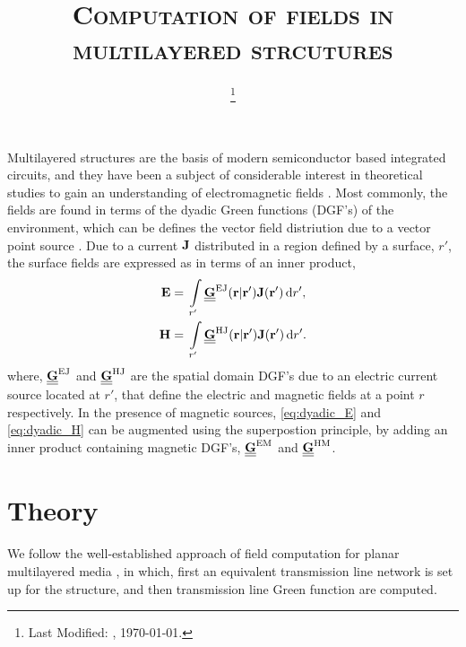 \documentclass[12pt]{article}
\begin{document}
\title{\textsc{Computation of fields in multilayered strcutures}}

\date{\footnote{Last Modified: \currenttime, \today.}}

\maketitle

Multilayered structures are the basis of modern semiconductor based integrated circuits, and they have been a subject of considerable interest in theoretical studies to gain an understanding of electromagnetic fields \cite{something in here}. Most commonly, the fields are found in terms of the dyadic Green functions (DGF's) of the environment, which can be defines the vector field distriution due to a vector point source \cite{van Bladdel} \cite{}. Due to a current $\mathbf{J}$ distributed in a region defined by a surface, $r'$, the surface fields are expressed as in terms of an inner product,
%
\begin{subequations}
  \begin{align}
    \mathbf{E} ={}& \int\limits_{r'} \underline{\underline{\mathbf{G}}}^\mathrm{EJ}(\mathbf{r} | \mathbf{r'}) \mathbf{J}(\mathbf{r'}) \mathop{}\!\mathrm{d}{r'},
    \label{eq:dyadic_E}\\
    \mathbf{H} ={}& \int\limits_{r'} \underline{\underline{\mathbf{G}}}^\mathrm{HJ}(\mathbf{r} | \mathbf{r'}) \mathbf{J}(\mathbf{r'}) \mathop{}\!\mathrm{d}{r'}.
    \label{eq:dyadic_H}
  \end{align}
  \label{eq:dyadic}%
\end{subequations}
where, $\underline{\underline{\mathbf{G}}}^\mathrm{EJ}$ and $\underline{\underline{\mathbf{G}}}^\mathrm{HJ}$ are the spatial domain DGF's due to an electric current source located at $r'$, that define the electric and magnetic fields at a point $r$ respectively. In the presence of magnetic sources, \eqref{eq:dyadic_E} and \eqref{eq:dyadic_H} can be augmented using the superpostion principle, by adding an inner product containing magnetic DGF's, $\underline{\underline{\mathbf{G}}}^\mathrm{EM}$ and
$\underline{\underline{\mathbf{G}}}^\mathrm{HM}$.
\section{Theory}
%
We follow the well-established approach of field computation for planar multilayered media \cite{michalski1997multilayered, michalski2005}, in which, first an equivalent transmission line network is set up for the structure, and then transmission line Green function are computed.
\end{document}

